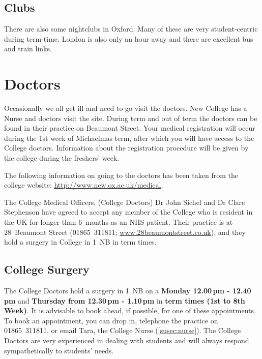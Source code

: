 \documentclass[a4paper,fleqn,12pt]{book} %
\begin{document}
\subsection{Clubs}
There are also some nightclubs in Oxford. Many of these are very student-centric during term-time. London is also only an hour away and there are excellent bus and train links.
\section{Doctors}
Occasionally we all get ill and need to go visit the doctors. New College has a Nurse and doctors visit the site. During term and out of term the doctors can be found in their practice on Beaumont Street. Your medical registration will occur during the 1st week of Michaelmas term, after which you will have access to the College doctors. Information about the registration procedure will be given by the college during the freshers’ week. 

The following information on going to the doctors has been taken from the
college website: \mbox{\url{http://www.new.ox.ac.uk/medical}}.

The College Medical Officers, (College Doctors) Dr John Sichel and Dr Clare
Stephenson have agreed to accept any member of the College who is resident in
the UK for longer than 6~months as an NHS patient. Their practice is at 28~Beaumont Street (01865~311811; \url{www.28beaumontstreet.co.uk}), and they hold
a surgery in College in 1~NB in term times.
\subsection{College Surgery}
The College Doctors hold a surgery in 1~NB on a {\textbf{Monday 12.00\,pm - 12.40\,pm}}
and {\textbf{Thursday from 12.30\,pm - 1.10\,pm}} in {\textbf{term times (1st to 8th
Week)}}. It is advisable to book ahead, if possible, for one of these
appointments. To book an appointment, you can drop in, telephone the practice on 01865~311811, or email
Tara, the College Nurse (\ref{susec:nurse}).
The College Doctors are very experienced in dealing with students and will always respond sympathetically to students' needs.
\end{document}
